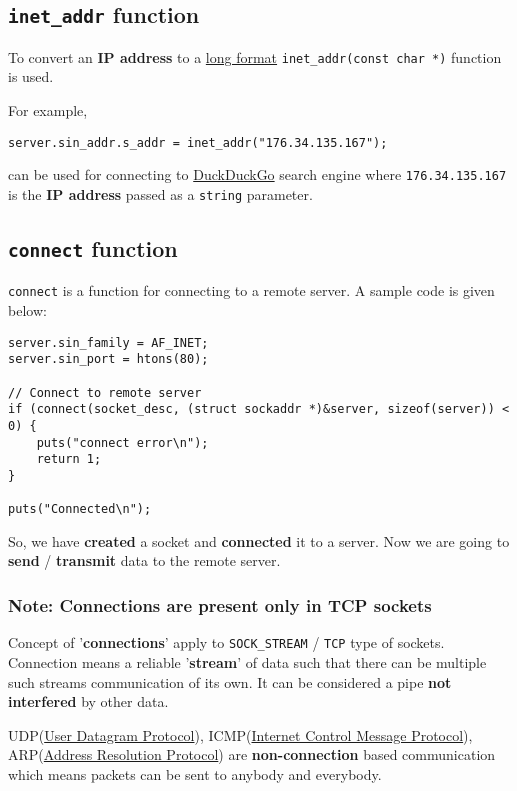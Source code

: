 \documentclass[11pt]{article}
\begin{document}
\subsection{\texttt{inet\_addr} function}
\label{sec:orgheadline3}
To convert an \textbf{IP address} to a \uline{long format} \texttt{inet\_addr(const char *)}
function is used.

For example,
\begin{verbatim}
server.sin_addr.s_addr = inet_addr("176.34.135.167");
\end{verbatim}
can be used for connecting to \href{http://176.34.135.167}{DuckDuckGo} search engine where \texttt{176.34.135.167} is
the \textbf{IP address} passed as a \texttt{string} parameter.
\subsection{\texttt{connect} function}
\label{sec:orgheadline5}
\texttt{connect} is a function for connecting to a remote server. A sample code is
given below:
\begin{verbatim}
server.sin_family = AF_INET;
server.sin_port = htons(80);

// Connect to remote server
if (connect(socket_desc, (struct sockaddr *)&server, sizeof(server)) < 0) {
	puts("connect error\n");
	return 1;
}

puts("Connected\n");
\end{verbatim}
So, we have \textbf{created} a socket and \textbf{connected} it to a server. Now we are going
to \textbf{send} / \textbf{transmit} data to the remote server.
\subsubsection{Note: \textbf{Connections are present only in TCP sockets}}
\label{sec:orgheadline4}
Concept of '\textbf{connections}' apply to \texttt{SOCK\_STREAM} / \texttt{TCP} type of sockets. Connection
means a reliable '\textbf{stream}' of data such that there can be multiple such streams
communication of its own. It can be considered a pipe \textbf{not interfered} by other data.

UDP(\href{https://en.wikipedia.org/wiki/User_Datagram_Protocol}{User Datagram Protocol}), ICMP(\href{https://en.wikipedia.org/wiki/Internet_Control_Message_Protocol}{Internet Control Message Protocol}), ARP(\href{https://en.wikipedia.org/wiki/Address_Resolution_Protocol}{Address Resolution Protocol})
are \textbf{non-connection} based communication which means packets can be sent to anybody
and everybody.
\end{document}
